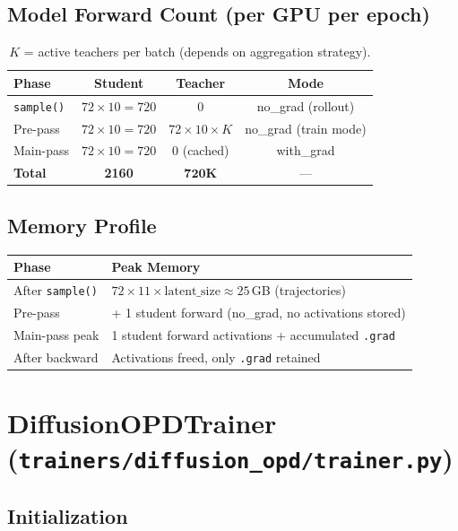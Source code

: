 \documentclass[11pt]{article}
\begin{document}
\subsection{Model Forward Count (per GPU per epoch)}

\begin{table}[h]
\centering
\begin{tabular}{lccc}
\toprule
Phase & Student & Teacher & Mode \\
\midrule
\texttt{sample()} & $72 \times 10 = 720$ & 0 & no\_grad (rollout) \\
Pre-pass & $72 \times 10 = 720$ & $72 \times 10 \times K$ & no\_grad (train mode) \\
Main-pass & $72 \times 10 = 720$ & 0 (cached) & with\_grad \\
\midrule
\textbf{Total} & \textbf{2160} & $\mathbf{720K}$ & --- \\
\bottomrule
\end{tabular}
\caption{$K$ = active teachers per batch (depends on aggregation strategy).}
\end{table}

\subsection{Memory Profile}

\begin{table}[h]
\centering
\begin{tabular}{ll}
\toprule
Phase & Peak Memory \\
\midrule
After \texttt{sample()} & $72 \times 11 \times \text{latent\_size} \approx 25$\,GB (trajectories) \\
Pre-pass & + 1 student forward (no\_grad, no activations stored) \\
Main-pass peak & 1 student forward activations + accumulated \texttt{.grad} \\
After backward & Activations freed, only \texttt{.grad} retained \\
\bottomrule
\end{tabular}
\end{table}

\section{DiffusionOPDTrainer (\texttt{trainers/diffusion\_opd/trainer.py})}

\subsection{Initialization}
\end{document}
